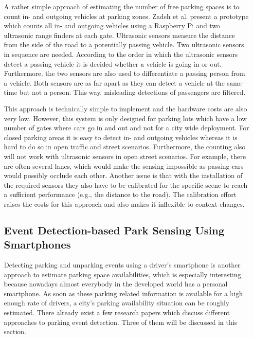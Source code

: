 A rather simple approach of estimating the number of free parking spaces is to count in- and outgoing vehicles at parking zones. Zadeh et al. \cite{smarturbanparkingdetection} present a prototype which counts all in- and outgoing vehicles using a Raspberry Pi and two ultrasonic range finders at each gate. Ultrasonic sensors measure the distance from the side of the road to a potentially passing vehicle. Two ultrasonic sensors in sequence are needed. According to the order in which the ultrasonic sensors detect a passing vehicle it is decided whether a vehicle is going in or out. Furthermore,
the two sensors are also used to differentiate a passing person from a vehicle. Both sensors are as far apart as they can detect a vehicle at the same time but not a person. This way, misleading detections of passengers are filtered.

This approach is technically simple to implement and the hardware costs are also very low. However, this system is only designed for parking lots which have a low number of gates where cars go in and out and not for a city wide deployment. For closed parking areas it is easy to detect in- and outgoing vehicles whereas it is hard to do so in open traffic and street scenarios. Furthermore, the counting also will not work with ultrasonic sensors in open street scenarios. For example, there are often several lanes, which would make the sensing impossible as passing cars would possibly occlude each other. Another issue is that with the installation of the required sensors they also have to be calibrated for the specific scene to reach a sufficient performance (e.g., the distance to the road). The calibration effort raises the costs for this approach and also makes it inflexible to context changes.







\subsection{Event Detection-based Park Sensing Using Smartphones}
\label{sec:event_detection_park_sensing}

Detecting parking and unparking events using a driver's smartphone is another approach to estimate parking space availabilities, which is especially interesting because nowadays almost everybody in the developed world has a personal smartphone. As soon as these parking related information is available for a high enough rate of drivers, a city's parking availability situation can be roughly estimated. There already exist a few research papers which discuss different approaches to parking event detection. Three of them will be discussed in this
section.

